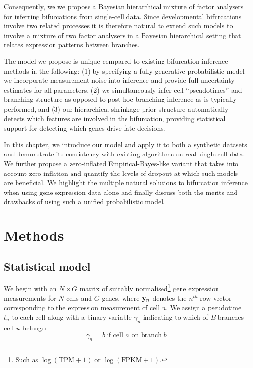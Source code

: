 Consequently, we we propose a Bayesian hierarchical mixture of factor analysers for inferring bifurcations from single-cell data.
Since developmental bifurcations involve two related processes it is therefore natural to extend such models to involve a mixture of two factor analysers in a Bayesian hierarchical setting that relates expression patterns between branches.

The model we propose is unique compared to existing bifurcation inference methods in the following: (1) by specifying a fully generative probabilistic model we incorporate measurement noise into inference and provide full uncertainty estimates for all parameters, (2) we simultaneously infer cell ``pseudotimes'' and branching structure as opposed to post-hoc branching inference as is typically performed, and (3) our hierarchical shrinkage prior structure automatically detects which features are involved in the bifurcation, providing statistical support for detecting which genes drive fate decisions.

In this chapter, we introduce our model and apply it to both a synthetic datasets and demonstrate its consistency with existing algorithms on real single-cell data. We further propose a zero-inflated Empirical-Bayes-like variant that takes into account zero-inflation and quantify the levels of dropout at which such models are beneficial.  We highlight the multiple natural solutions to bifurcation inference when using gene expression data alone and finally discuss both the merits and drawbacks of using such a unified probabilistic model.


\section{Methods}

\subsection{Statistical model}

We begin with an $N \times G$ matrix of suitably normalised\footnote{Such as $\log(\text{TPM} + 1)$ or $\log(\text{FPKM} + 1)$.} gene expression measurements for $N$ cells and $G$ genes, where ${\bf y}_n$ denotes the $n^{th}$ row vector corresponding to the expression measurement of cell $n$. We assign a pseudotime $t_n$ to each cell along with a binary variable $\gamma_n$ indicating to which of $B$ branches cell $n$ belongs:
\begin{equation}
\gamma_n = b \; \mbox{if cell $n$ on branch $b$}
\end{equation}

